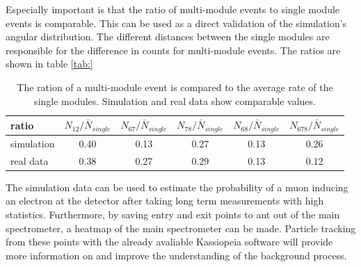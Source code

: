   Especially important is that the ratio of multi-module events to single module events is comparable. This can be used as a direct validation of the simulation's angular distribution. The different distances between the single modules are responsible for the difference in counts for multi-module events.
  The ratios are shown in table \ref{tab:}
  \begin{table}
  \centering
  \begin{tabular}{|l|c|c|c|c|c|}
  
  \hline
  	\rule{0pt}{4ex} ratio &$N_{12}/\bar N_{single} $&$ N_{67}/\bar N_{single}$ & $N_{78}/\bar N_{single} $& $N_{68}/\bar N_{single} $& $N_{678}/\bar N_{single}$\\
  	\hline
	simulation & 0.40 & 0.13 & 0.27 & 0.13 & 0.26\\
	real data & 0.38 & 0.27 & 0.29 & 0.13 & 0.12 \\
	\hline
  	\end{tabular}
  	\caption[Single \& Multi side event ratio]{The ration of a multi-module event is compared to the average rate of the single modules. Simulation and real data show comparable values.}
  \end{table}

  The simulation data can be used to estimate the probability of a muon inducing an electron at the detector after taking long term measurements with high statistics.
  Furthermore, by saving entry and exit points to ant out of the main spectrometer, a heatmap of the main spectrometer can be made. Particle tracking from these points with the already avaliable Kassiopeia software will provide more information on and improve the understanding of the background process.
  
  
  
  
  